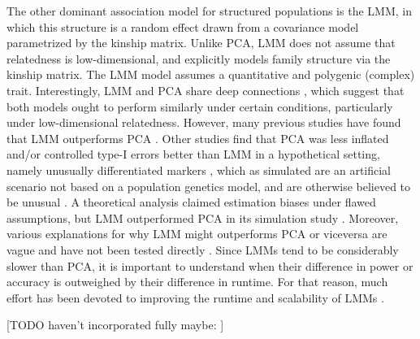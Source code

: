 \documentclass[11pt]{article}
\begin{document}
The other dominant association model for structured populations is the LMM, in which this structure is a random effect drawn from a covariance model parametrized by the kinship matrix.
Unlike PCA, LMM does not assume that relatedness is low-dimensional, and explicitly models family structure via the kinship matrix.
The LMM model assumes a quantitative and polygenic (complex) trait.
Interestingly, LMM and PCA share deep connections \citep{astle_population_2009, hoffman_correcting_2013}, which suggest that both models ought to perform similarly under certain conditions, particularly under low-dimensional relatedness.
However, many previous studies have found that LMM outperforms PCA \citep{
  zhao_arabidopsis_2007,
  astle_population_2009,
  kang_variance_2010,
  wu_comparison_2011, %
  song_testing_2015}.
Other studies find that PCA was less inflated and/or controlled type-I errors better than LMM in a hypothetical setting, namely unusually differentiated markers \citep{price_new_2010, wu_comparison_2011}, which as simulated are an artificial scenario not based on a population genetics model, and are otherwise believed to be unusual \citep{sul_mixed_2013, price_response_2013}.
A theoretical analysis claimed estimation biases under flawed assumptions, but LMM outperformed PCA in its simulation study \citep{wang_analytical_2013}.
Moreover, various explanations for why LMM might outperforms PCA or viceversa are vague and have not been tested directly \citep{price_new_2010, sul_mixed_2013, price_response_2013, hoffman_correcting_2013}.
Since LMMs tend to be considerably slower than PCA, it is important to understand when their difference in power or accuracy is outweighed by their difference in runtime.
For that reason, much effort has been devoted to improving the runtime and scalability of LMMs \citep{aulchenko_genomewide_2007, kang_efficient_2008, kang_variance_2010, zhang_mixed_2010, lippert_fast_2011, yang_gcta:_2011, listgarten_improved_2012, zhou_genome-wide_2012, svishcheva_rapid_2012, loh_efficient_2015, zhou_efficiently_2018}.

[TODO haven't incorporated fully maybe: \citep{thornton_roadtrips:_2010}]
\end{document}
